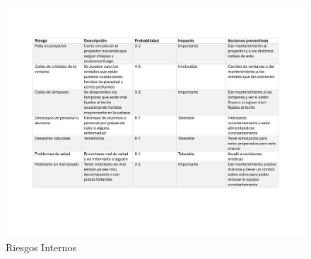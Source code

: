\begin{figure}[H]
    \centering
    \includegraphics[scale=0.3]{13/img/riesgosInternos.pdf}
    \caption{Riesgos Internos}
\end{figure}
% 
% 
% 
% 
